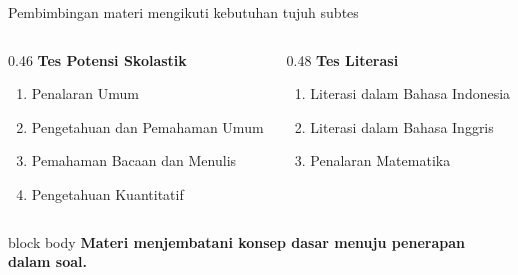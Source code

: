 \begin{frame}{Pembimbingan materi mengikuti kebutuhan tujuh subtes}
  \begin{columns}[T,onlytextwidth]
    \begin{column}{0.46\textwidth}
      {\color{StudentBlue}\bfseries Tes Potensi Skolastik}\par
      \begin{enumerate}
        \item Penalaran Umum
        \item Pengetahuan dan Pemahaman Umum
        \item Pemahaman Bacaan dan Menulis
        \item Pengetahuan Kuantitatif
      \end{enumerate}
    \end{column}
    \begin{column}{0.48\textwidth}
      {\color{StudentBlue}\bfseries Tes Literasi}\par
      \begin{enumerate}
        \item Literasi dalam Bahasa Indonesia
        \item Literasi dalam Bahasa Inggris
        \item Penalaran Matematika
      \end{enumerate}
    \end{column}
  \end{columns}
  \vspace{0.20cm}
  \begin{beamercolorbox}[rounded=true,sep=0.18cm,wd=\textwidth]{block body}
    \centering\bfseries Materi menjembatani konsep dasar menuju penerapan dalam soal.
  \end{beamercolorbox}
\end{frame}

